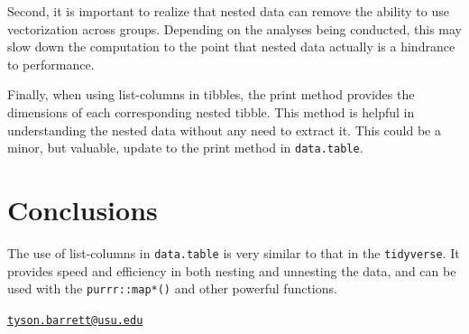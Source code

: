 Second, it is important to realize that nested data can remove the
ability to use vectorization across groups. Depending on the analyses
being conducted, this may slow down the computation to the point that
nested data actually is a hindrance to performance.

Finally, when using list-columns in tibbles, the print method provides
the dimensions of each corresponding nested tibble. This method is
helpful in understanding the nested data without any need to extract it.
This could be a minor, but valuable, update to the print method in
\texttt{data.table}.

\hypertarget{conclusions}{%
\section{Conclusions}\label{conclusions}}

The use of list-columns in \texttt{data.table} is very similar to that
in the \texttt{tidyverse}. It provides speed and efficiency in both
nesting and unnesting the data, and can be used with the
\texttt{purrr::map*()} and other powerful functions.




\address{%
Tyson S. Barrett\\
Utah State University\\
2800 Old Main Hill\\ Logan, UT 84322\\
}
\href{mailto:tyson.barrett@usu.edu}{\nolinkurl{tyson.barrett@usu.edu}}

